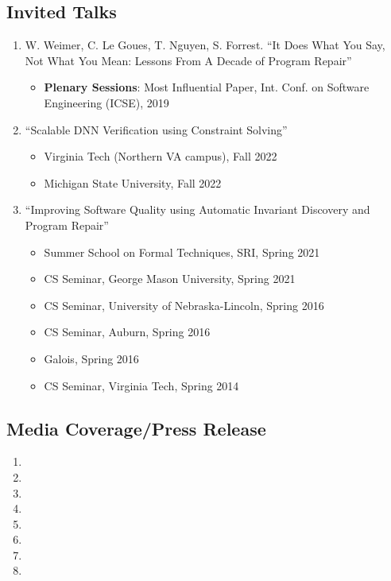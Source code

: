 \documentclass[11pt]{article}
\begin{document}
\subsection{Invited Talks}
\begin{enumerate}[label=T\arabic*]
    \item W. Weimer, C. Le Goues, T. Nguyen, S. Forrest. ``It Does What You Say, Not What You Mean: Lessons From A Decade of Program Repair''
    \begin{itemize}[label={},before=\small]
        \item \textbf{Plenary Sessions}:  Most Influential Paper, Int. Conf. on Software Engineering (ICSE), 2019
    \end{itemize}
    
    \item ``Scalable DNN Verification using Constraint Solving''
    \begin{itemize}[label={},before=\small]
        \item Virginia Tech (Northern VA campus), Fall 2022
        \item Michigan State University, Fall 2022
    \end{itemize}
    
    \item ``Improving Software Quality using Automatic Invariant Discovery and Program Repair''
    \begin{itemize}[label={},before=\small]
        \item Summer School on Formal Techniques, SRI, Spring 2021
        \item CS Seminar, George Mason University, Spring 2021
        \item CS Seminar, University of Nebraska-Lincoln, Spring 2016
        \item CS Seminar, Auburn, Spring 2016
        \item Galois, Spring 2016
        \item CS Seminar, Virginia Tech, Spring 2014
    \end{itemize}
\end{enumerate}



\subsection{Media Coverage/Press Release}
\begin{enumerate}[label=M\arabic*]
  \item {}  
    \item {}
    \item {}
    \item {}
    \item {}
    \item {}
    \item {}
    \item {}
\end{enumerate}
\end{document}
